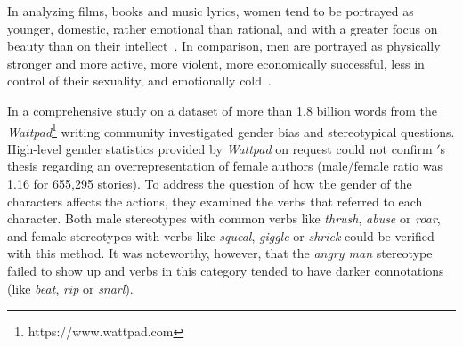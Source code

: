 In analyzing films, books and music lyrics, women tend to be portrayed as younger, domestic, rather emotional than rational, and with a greater focus on beauty than on their intellect~\citep{Towbin2004ImagesAnimatedFilms, Gooden2001Gender19951999}.
In comparison, men are portrayed as physically stronger and more active, more violent, more economically successful, less in control of their sexuality, and emotionally cold~\citep{Emons2010HeTelevision, Bretthauer2007AMusic, Lauzen2008ConstructingTelevision, Soulliere2006WrestlingWWE}.

In a comprehensive study on a dataset of more than 1.8 billion words from the \emph{Wattpad}\footnote{https://www.wattpad.com} writing community \citet{Fast2016ShirtlessCommunity} investigated gender bias and stereotypical questions.
High-level gender statistics provided by \emph{Wattpad} on request could not confirm \citet{Duggan2020WhoAO3}$'$s thesis regarding an overrepresentation of female authors (male/female ratio was 1.16 for 655,295 stories).
To address the question of how the gender of the characters affects the actions, they examined the verbs that referred to each character.
Both male stereotypes with common verbs like \emph{thrush}, \emph{abuse} or \emph{roar}, and female stereotypes with verbs like \emph{squeal}, \emph{giggle} or \emph{shriek} could be verified with this method.
It was noteworthy, however, that the \emph{angry man} stereotype failed to show up and verbs in this category tended to have darker connotations (like \emph{beat}, \emph{rip} or \emph{snarl}).

